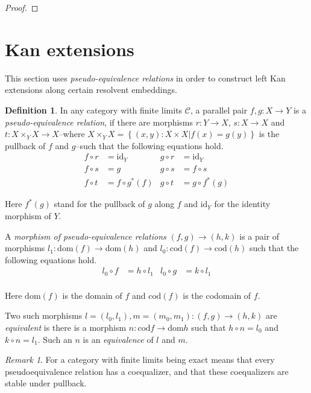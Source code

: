\documentclass[sort&compress,draft]{elsarticle}
\theoremstyle{plain}
\theoremstyle{definition}
\newtheorem{definition}[theorem]{Definition}
\theoremstyle{remark}
\newtheorem{remark}[theorem]{Remark}
\newcommand\hide[1]{}
\newcommand\key[1]{\emph{#1}\label{#1}}
\newcommand\cat\mathcal
\newcommand\set[1]{\left\{#1\right\}}
\newcommand\of:
\newcommand\ri{^*}
\newcommand\id{\mathrm{id}}
\newcommand\dom{\mathrm{dom}}
\newcommand\cod{\mathrm{cod}}
\begin{document}
\begin{proof}
\hide{Point ahead to lemmas down this paper

ThB -> lccc, closubclass, ...

}
\end{proof}

\hide{conclusion... }

\section{Kan extensions}
This section uses \emph{pseudo-equivalence relations} in order to construct left Kan extensions along certain resolvent embeddings.

\begin{definition} In any category with finite limits $\cat C$, a parallel pair $f,g\of X\to Y$ is a \key{pseudo-equivalence relation}, if there are morphisms $r:Y\to X$, $s:X\to X$ and $t:X\times_YX \to X$--where $X\times_YX = \set{(x,y)\of X\times X|f(x)=g(y)}$ is the pullback of $f$ and $g$--such that the following equations hold.
\begin{align*}
f\circ r &=\id_Y & g\circ r &= \id_Y\\
f\circ s &= g & g\circ s &= f\circ s\\
f\circ t &= f\circ g\ri(f) & g\circ t &= g\circ f\ri(g)
\end{align*}

Here $f\ri(g)$ stand for the pullback of $g$ along $f$ and $\id_Y$ for the identity morphism of $Y$.

A \emph{morphism of pseudo-equivalence relations} $(f,g) \to (h,k)$ is a pair of morphisms $l_1\of \dom(f) \to \dom(h)$ and $l_0\of \cod(f) \to \cod(h)$ such that the following equations hold.
\begin{align*}
l_0\circ f &= h\circ l_1 & l_0\circ g &= k\circ l_1\\
\end{align*}

Here $\dom(f)$ is the domain of $f$ and $\cod(f)$ is the codomain of $f$.

Two such morphisms $l=(l_0,l_1),m=(m_0,m_1):(f,g) \to (h,k)$ are \emph{equivalent} is there is a morphism $n\of \cod f \to \dom h$ such that $h\circ n = l_0$ and $k\circ n = l_1$. Such an $n$ is an \emph{equivalence} of $l$ and $m$.
\end{definition}

\begin{remark} For a category with finite limits being exact means that every pseudoequivalence relation has a coequalizer, and that these coequalizers are stable under pullback.
\end{remark}
\end{document}

